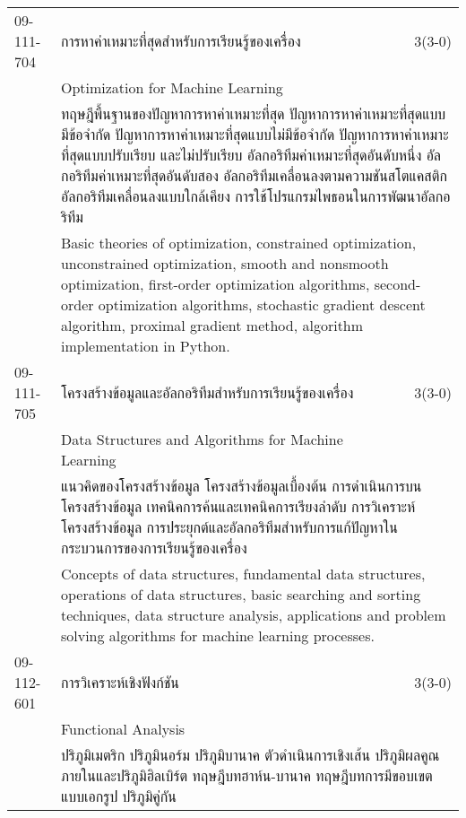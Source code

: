 \begin{longtable}{p{}p{}r{}}
09-111-704 & การหาค่าเหมาะที่สุดสำหรับการเรียนรู้ของเครื่อง & 3(3-0)\\*
 & Optimization for Machine Learning & \phantom{x} \vspace{3mm} \\*
&  \multicolumn{2}{p{0.75\textwidth}}{ทฤษฎีพื้นฐานของปัญหาการหาค่าเหมาะที่สุด ปัญหาการหาค่าเหมาะที่สุดแบบมีข้อจำกัด ปัญหาการหาค่าเหมาะที่สุดแบบไม่มีข้อจำกัด ปัญหาการหาค่าเหมาะที่สุดแบบปรับเรียบ และไม่ปรับเรียบ อัลกอริทึมค่าเหมาะที่สุดอันดับหนึ่ง อัลกอริทึมค่าเหมาะที่สุดอันดับสอง อัลกอริทึมเคลื่อนลงตามความชันสโตแคสติก อัลกอริทึมเคลื่อนลงแบบใกล้เคียง การใช้โปรแกรมไพธอนในการพัฒนาอัลกอริทึม} \vspace{3mm} \\*
&  \multicolumn{2}{p{0.75\textwidth}}{Basic theories of optimization, constrained optimization, unconstrained optimization, smooth and nonsmooth optimization, first-order optimization algorithms, second-order optimization algorithms, stochastic gradient descent algorithm, proximal gradient method, algorithm implementation in Python.} \vspace{8mm} \\*
09-111-705 & โครงสร้างข้อมูลและอัลกอริทึมสำหรับการเรียนรู้ของเครื่อง & 3(3-0)\\*
 & Data Structures and Algorithms for Machine Learning & \phantom{x} \vspace{3mm} \\*
&  \multicolumn{2}{p{0.75\textwidth}}{แนวคิดของโครงสร้างข้อมูล โครงสร้างข้อมูลเบื้องต้น การดำเนินการบนโครงสร้างข้อมูล เทคนิคการค้นและเทคนิคการเรียงลำดับ การวิเคราะห์โครงสร้างข้อมูล การประยุกต์และอัลกอริทึมสำหรับการแก้ปัญหาในกระบวนการของการเรียนรู้ของเครื่อง} \vspace{3mm} \\*
&  \multicolumn{2}{p{0.75\textwidth}}{Concepts of data structures, fundamental data structures, operations of data structures, basic searching and sorting techniques, data structure analysis, applications and problem solving algorithms for machine learning processes.} \vspace{8mm} \\*
09-112-601 & การวิเคราะห์เชิงฟังก์ชัน & 3(3-0)\\*
 & Functional Analysis & \phantom{x} \vspace{3mm} \\*
&  \multicolumn{2}{p{0.75\textwidth}}{ปริภูมิเมตริก ปริภูมินอร์ม ปริภูมิบานาค ตัวดำเนินการเชิงเส้น ปริภูมิผลคูณภายในและปริภูมิฮิลเบิร์ต ทฤษฎีบทฮาห์น-บานาค ทฤษฎีบทการมีขอบเขตแบบเอกรูป ปริภูมิคู่กัน} \vspace{3mm} \\*

\end{longtable}
